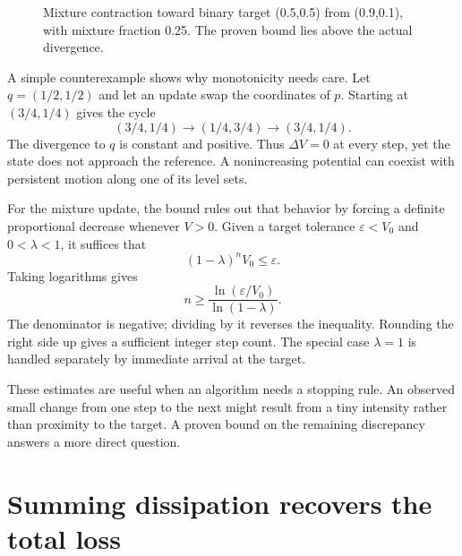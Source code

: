 \documentclass[11pt,oneside,openany]{book}
\theoremstyle{definition}
\theoremstyle{remark}
\numberwithin{equation}{chapter}
\begin{document}
\begin{figure}[htbp]\centering
{}
\caption{Mixture contraction toward binary target (0.5,0.5) from (0.9,0.1), with mixture fraction 0.25. The proven bound lies above the actual divergence.}\end{figure}

A simple counterexample shows why monotonicity needs care. Let \(q=(1/2,1/2)\) and let an update swap the coordinates of \(p\). Starting at \((3/4,1/4)\) gives the cycle \[(3/4,1/4)\to(1/4,3/4)\to(3/4,1/4).\] The divergence to \(q\) is constant and positive. Thus \(\Delta V=0\) at every step, yet the state does not approach the reference. A nonincreasing potential can coexist with persistent motion along one of its level sets.

For the mixture update, the bound rules out that behavior by forcing a definite proportional decrease whenever \(V>0\). Given a target tolerance \(\varepsilon<V_0\) and \(0<\lambda<1\), it suffices that \[(1-\lambda)^nV_0\leq\varepsilon.\] Taking logarithms gives \[n\geq\frac{\ln(\varepsilon/V_0)}{\ln(1-\lambda)}.\] The denominator is negative; dividing by it reverses the inequality. Rounding the right side up gives a sufficient integer step count. The special case \(\lambda=1\) is handled separately by immediate arrival at the target.

These estimates are useful when an algorithm needs a stopping rule. An observed small change from one step to the next might result from a tiny intensity rather than proximity to the target. A proven bound on the remaining discrepancy answers a more direct question.

\section{Summing dissipation recovers the total loss}\label{ch06-summing-dissipation-recovers-the-total-loss}
\end{document}
